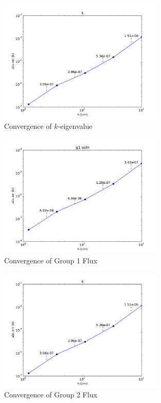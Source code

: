 \documentclass[11pt]{article} %
\begin{document}
\begin{figure}[H]
\centering
   \includegraphics[width=0.7\textwidth]{k}
   \caption{Convergence of $k$-eigenvalue}
   \label{k}
\end{figure}
\begin{figure}[H]
\centering
   \includegraphics[width=0.7\textwidth]{g1}
   \caption{Convergence of Group 1 Flux}
   \label{g1}
\end{figure}
\begin{figure}[H]
\centering
   \includegraphics[width=0.7\textwidth]{k}
   \caption{Convergence of Group 2 Flux}
   \label{g2}
\end{figure}
\end{document}
